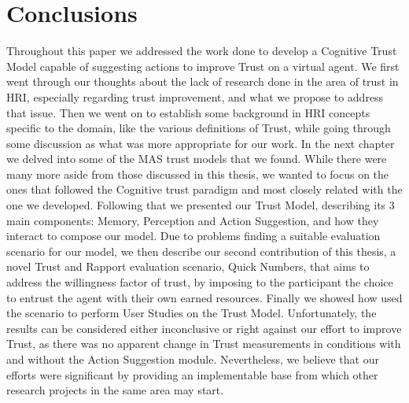 \section{Conclusions}
Throughout this paper we addressed the work done to develop a Cognitive Trust Model capable of suggesting actions to improve Trust on a virtual agent. We first went through our thoughts about the lack of research done in the area of trust in \ac{HRI}, especially regarding trust improvement, and what we propose to address that issue. Then we went on to establish some background in \ac{HRI} concepts specific to the domain, like the various definitions of Trust, while going through some discussion as what was more appropriate for our work. In the next chapter we delved into some of the MAS trust models that we found. While there were many more aside from those discussed in this thesis, we wanted to focus on the ones that followed the Cognitive trust paradigm and most closely related with the one we developed. Following that we presented our Trust Model, describing its 3 main components: Memory, Perception and Action Suggestion, and how they interact to compose our model. Due to problems finding a suitable evaluation scenario for our model, we then describe our second contribution of this thesis, a novel Trust and Rapport evaluation scenario, Quick Numbers, that aims to address the willingness factor of trust, by imposing to the participant the choice to entrust the agent with their own earned resources. Finally we showed how used the scenario to perform User Studies on the Trust Model. Unfortunately, the results can be considered either inconclusive or right against our effort to improve Trust, as there was no apparent change in Trust measurements in conditions with and without the Action Suggestion module. Nevertheless, we believe that our efforts were significant by providing an implementable base from which other research projects in the same area may start. 